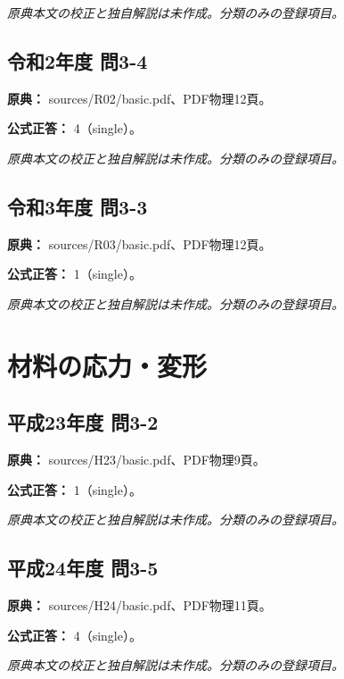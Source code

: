 \par\textit{原典本文の校正と独自解説は未作成。分類のみの登録項目。}

\subsection{令和2年度 問3-4}
\label{q:r02-reg-basic-3-4}

\noindent\textbf{原典：} sources/R02/basic.pdf、PDF物理12頁。

\textbf{公式正答：} 4（single）。

\par\textit{原典本文の校正と独自解説は未作成。分類のみの登録項目。}

\subsection{令和3年度 問3-3}
\label{q:r03-reg-basic-3-3}

\noindent\textbf{原典：} sources/R03/basic.pdf、PDF物理12頁。

\textbf{公式正答：} 1（single）。

\par\textit{原典本文の校正と独自解説は未作成。分類のみの登録項目。}

\section{材料の応力・変形}

\subsection{平成23年度 問3-2}
\label{q:h23-reg-basic-3-2}

\noindent\textbf{原典：} sources/H23/basic.pdf、PDF物理9頁。

\textbf{公式正答：} 1（single）。

\par\textit{原典本文の校正と独自解説は未作成。分類のみの登録項目。}

\subsection{平成24年度 問3-5}
\label{q:h24-reg-basic-3-5}

\noindent\textbf{原典：} sources/H24/basic.pdf、PDF物理11頁。

\textbf{公式正答：} 4（single）。

\par\textit{原典本文の校正と独自解説は未作成。分類のみの登録項目。}

